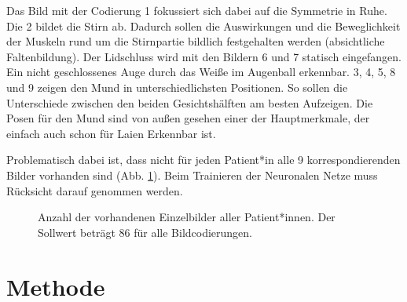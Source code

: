 Das Bild mit der Codierung 1 fokussiert sich dabei auf die Symmetrie in Ruhe. Die 2 bildet die Stirn ab. Dadurch sollen die Auswirkungen und die Beweglichkeit der Muskeln rund um die Stirnpartie bildlich festgehalten werden (absichtliche Faltenbildung). Der Lidschluss wird mit den Bildern 6 und 7 statisch eingefangen. Ein nicht geschlossenes Auge durch das Weiße im Augenball erkennbar. 3, 4, 5, 8 und 9 zeigen den Mund in unterschiedlichsten Positionen. So sollen die Unterschiede zwischen den beiden Gesichtshälften am besten Aufzeigen. Die Posen für den Mund sind von außen gesehen einer der Hauptmerkmale, der einfach auch schon für Laien Erkennbar ist.

Problematisch dabei ist, dass nicht für jeden Patient*in alle 9 korrespondierenden Bilder vorhanden sind (Abb. \ref{cap:bar_code}). Beim Trainieren der Neuronalen Netze muss Rücksicht darauf genommen werden.


\begin{figure}[!tb]\centering
{}
\caption[Anzahl der vorhandenen  Einzelbilder aller Patient*innen]{Anzahl der vorhandenen  Einzelbilder aller Patient*innen. Der Sollwert beträgt 86 für alle Bildcodierungen.}\label{cap:bar_code}
\end{figure}\label{fig:bar_code}





\clearpage
\section{Methode}\label{method}
